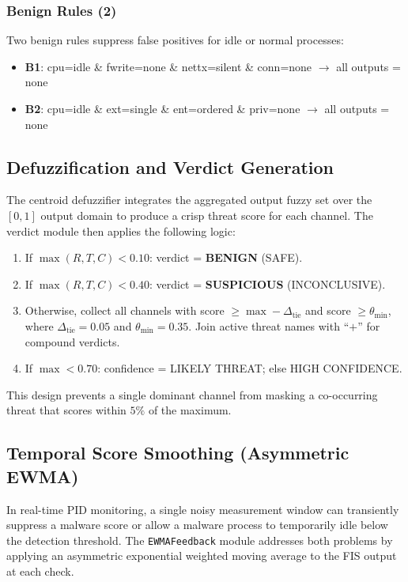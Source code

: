\documentclass[conference]{IEEEtran}
\begin{document}
\subsubsection{Benign Rules (2)}

Two benign rules suppress false positives for idle or normal processes:
\begin{itemize}[leftmargin=2em]
  \item \textbf{B1}: cpu=idle \& fwrite=none \& nettx=silent \& conn=none
        $\rightarrow$ all outputs = none
  \item \textbf{B2}: cpu=idle \& ext=single \& ent=ordered \& priv=none
        $\rightarrow$ all outputs = none
\end{itemize}

\subsection{Defuzzification and Verdict Generation}

The centroid defuzzifier integrates the aggregated output fuzzy set over
the $[0,1]$ output domain to produce a crisp threat score for each
channel. The verdict module then applies the following logic:

\begin{enumerate}[leftmargin=2em]
  \item If $\max(R, T, C) < 0.10$: verdict = \textbf{BENIGN} (SAFE).
  \item If $\max(R, T, C) < 0.40$: verdict = \textbf{SUSPICIOUS} (INCONCLUSIVE).
  \item Otherwise, collect all channels with score
        $\geq \max - \Delta_{\text{tie}}$ and score $\geq \theta_{\text{min}}$,
        where $\Delta_{\text{tie}} = 0.05$ and $\theta_{\text{min}} = 0.35$.
        Join active threat names with ``$+$'' for compound verdicts.
  \item If $\max < 0.70$: confidence = LIKELY THREAT; else HIGH CONFIDENCE.
\end{enumerate}

This design prevents a single dominant channel from masking a
co-occurring threat that scores within $5\%$ of the maximum.

\subsection{Temporal Score Smoothing (Asymmetric EWMA)}
\label{sec:ewma}

In real-time PID monitoring, a single noisy measurement window can
transiently suppress a malware score or allow a malware process to
temporarily idle below the detection threshold. The
\texttt{EWMAFeedback} module addresses both problems by applying an
asymmetric exponential weighted moving average to the FIS output at each
check.
\end{document}
